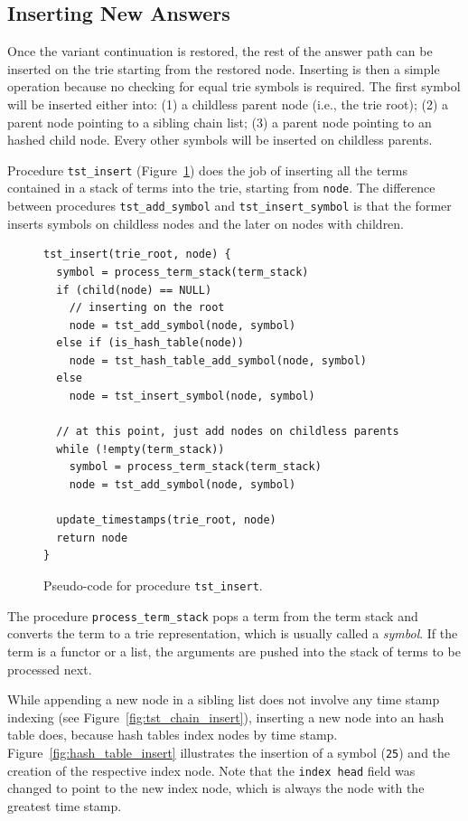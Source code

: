 \subsection{Inserting New Answers}

Once the variant continuation is restored, the rest of the answer path can be inserted on the trie starting
from the restored node. Inserting is then a simple operation because no checking for equal trie symbols is required.
The first symbol will be inserted either into: (1) a childless parent node (i.e., the trie root);
(2) a parent node pointing to a sibling chain list; (3) a parent node pointing to an hashed child node.
Every other symbols will be inserted on childless parents.

Procedure \texttt{tst\_insert} (Figure~\ref{fig:tst_insert}) does the job of inserting
all the terms contained in a stack of terms into the trie, starting from \texttt{node}.
The difference between procedures \texttt{tst\_add\_symbol} and \texttt{tst\_insert\_symbol}
is that the former inserts symbols on childless nodes and the later on nodes with children.

\begin{figure}[ht]
\begin{Verbatim}
tst_insert(trie_root, node) {
  symbol = process_term_stack(term_stack)
  if (child(node) == NULL)
    // inserting on the root
    node = tst_add_symbol(node, symbol)
  else if (is_hash_table(node))
    node = tst_hash_table_add_symbol(node, symbol)
  else
    node = tst_insert_symbol(node, symbol)
  
  // at this point, just add nodes on childless parents
  while (!empty(term_stack))
    symbol = process_term_stack(term_stack)
    node = tst_add_symbol(node, symbol)
  
  update_timestamps(trie_root, node)
  return node
}
\end{Verbatim}
\caption{Pseudo-code for procedure \texttt{tst\_insert}.}
\label{fig:tst_insert}
\end{figure}

The procedure \texttt{process\_term\_stack} pops a term from the term stack and converts the term
to a trie representation, which is usually called a \textit{symbol}. If the term is a functor or a list,
the arguments are pushed into the stack of terms to be processed next.

While appending a new node in a sibling list does not involve any
time stamp indexing (see Figure~\ref{fig:tst_chain_insert}), inserting a new node into an hash table does,
because hash tables index nodes by time stamp.
Figure~\ref{fig:hash_table_insert}
illustrates the insertion of a symbol (\texttt{25}) and the creation of the respective
index node. Note that the \texttt{index head} field was changed to point to the new index node,
which is always the node with the greatest time stamp.


